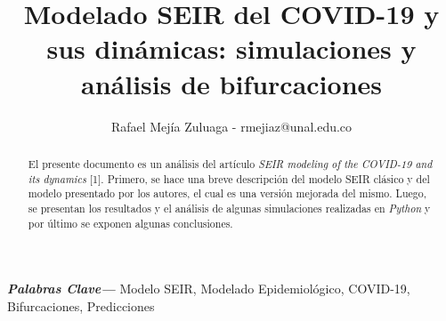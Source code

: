 \documentclass[conference]{IEEEtran}
\providecommand{\keywords}[1]
{
  \small	
  \textbf{\textit{Palabras Clave---}} #1
}
\begin{document}
    

\title{Modelado SEIR del COVID-19 y sus dinámicas: simulaciones y análisis de 
bifurcaciones}

\author{Rafael Mejía Zuluaga - rmejiaz@unal.edu.co}

\maketitle


\begin{abstract}
    El presente documento es un análisis del artículo \textit{SEIR modeling of the
    COVID-19 and its dynamics} [1]. Primero, se hace una breve descripción del modelo SEIR 
    clásico y del modelo presentado por los autores, el cual es una versión mejorada del mismo.
    Luego, se presentan los resultados y el análisis de algunas simulaciones realizadas en 
    \textit{Python} y por último se exponen algunas conclusiones.  
    \newline
\end{abstract}

\keywords{Modelo SEIR, Modelado Epidemiológico, COVID-19, Bifurcaciones, Predicciones}
\end{document}
